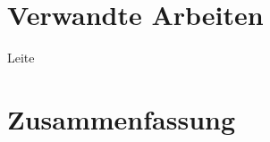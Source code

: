\documentclass[conference,compsoc]{IEEEtran}
\begin{document}
\section{Verwandte Arbeiten}

Leite \cite{leite2013systematic}\\


\section{Zusammenfassung}



%
%







%
%
%









\end{document}
